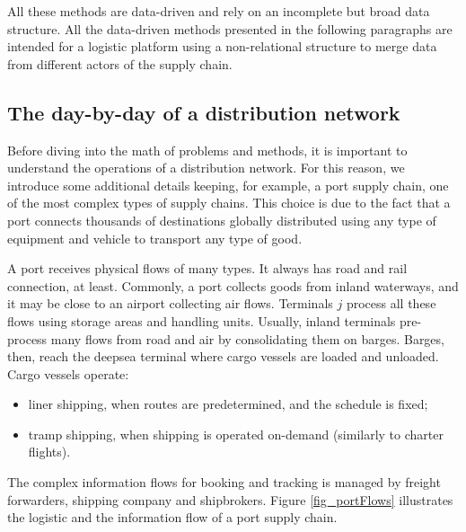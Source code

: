 All these methods are data-driven and rely on an incomplete but broad data structure. All the data-driven methods presented in the following paragraphs are intended for a logistic platform using a non-relational structure to merge data from different actors of the supply chain.

\subsection{The day-by-day of a distribution network}
Before diving into the math of problems and methods, it is important to understand the operations of a distribution network. For this reason, we introduce some additional details keeping, for example, a port supply chain, one of the most complex types of supply chains. This choice is due to the fact that a port connects thousands of destinations globally distributed using any type of equipment and vehicle to transport any type of good. \par

A port receives physical flows of many types. It always has road and rail connection, at least. Commonly, a port collects goods from inland waterways, and it may be close to an airport collecting air flows. Terminals $j$ process all these flows using storage areas and handling units. Usually, inland terminals pre-process many flows from road and air by consolidating them on barges. Barges, then, reach the deepsea terminal where cargo vessels are loaded and unloaded. Cargo vessels operate:

\begin{itemize}
    \item liner shipping, when routes are predetermined, and the schedule is fixed;
    \item tramp shipping, when shipping is operated on-demand (similarly to charter flights).

\end{itemize}

The complex information flows for booking and tracking is managed by freight forwarders, shipping company and shipbrokers. Figure \ref{fig_portFlows} illustrates the logistic and the information flow of a port supply chain.



